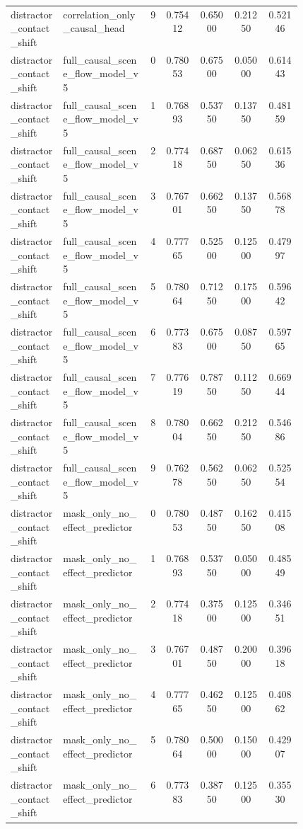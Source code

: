 \documentclass{article}
\begin{document}
\begin{center}
\begin{longtable}{p{0.18\linewidth}p{0.30\linewidth}ccccc}
distractor\_contact\_shift & correlation\_only\_causal\_head & 9 & 0.75412 & 0.65000 & 0.21250 & 0.52146\\
distractor\_contact\_shift & full\_causal\_scene\_flow\_model\_v5 & 0 & 0.78053 & 0.67500 & 0.05000 & 0.61443\\
distractor\_contact\_shift & full\_causal\_scene\_flow\_model\_v5 & 1 & 0.76893 & 0.53750 & 0.13750 & 0.48159\\
distractor\_contact\_shift & full\_causal\_scene\_flow\_model\_v5 & 2 & 0.77418 & 0.68750 & 0.06250 & 0.61536\\
distractor\_contact\_shift & full\_causal\_scene\_flow\_model\_v5 & 3 & 0.76701 & 0.66250 & 0.13750 & 0.56878\\
distractor\_contact\_shift & full\_causal\_scene\_flow\_model\_v5 & 4 & 0.77765 & 0.52500 & 0.12500 & 0.47997\\
distractor\_contact\_shift & full\_causal\_scene\_flow\_model\_v5 & 5 & 0.78064 & 0.71250 & 0.17500 & 0.59642\\
distractor\_contact\_shift & full\_causal\_scene\_flow\_model\_v5 & 6 & 0.77383 & 0.67500 & 0.08750 & 0.59765\\
distractor\_contact\_shift & full\_causal\_scene\_flow\_model\_v5 & 7 & 0.77619 & 0.78750 & 0.11250 & 0.66944\\
distractor\_contact\_shift & full\_causal\_scene\_flow\_model\_v5 & 8 & 0.78004 & 0.66250 & 0.21250 & 0.54686\\
distractor\_contact\_shift & full\_causal\_scene\_flow\_model\_v5 & 9 & 0.76278 & 0.56250 & 0.06250 & 0.52554\\
distractor\_contact\_shift & mask\_only\_no\_effect\_predictor & 0 & 0.78053 & 0.48750 & 0.16250 & 0.41508\\
distractor\_contact\_shift & mask\_only\_no\_effect\_predictor & 1 & 0.76893 & 0.53750 & 0.05000 & 0.48549\\
distractor\_contact\_shift & mask\_only\_no\_effect\_predictor & 2 & 0.77418 & 0.37500 & 0.12500 & 0.34651\\
distractor\_contact\_shift & mask\_only\_no\_effect\_predictor & 3 & 0.76701 & 0.48750 & 0.20000 & 0.39618\\
distractor\_contact\_shift & mask\_only\_no\_effect\_predictor & 4 & 0.77765 & 0.46250 & 0.12500 & 0.40862\\
distractor\_contact\_shift & mask\_only\_no\_effect\_predictor & 5 & 0.78064 & 0.50000 & 0.15000 & 0.42907\\
distractor\_contact\_shift & mask\_only\_no\_effect\_predictor & 6 & 0.77383 & 0.38750 & 0.12500 & 0.35530\\

\end{longtable}
\end{center}
\end{document}

